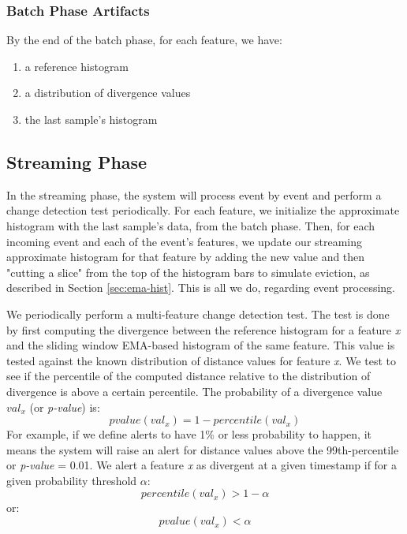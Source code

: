 \documentclass[sigconf]{acmart}
\begin{document}
\subsubsection{Batch Phase Artifacts} \label{sec:batch-artifacts-summary}
By the end of the batch phase, for each feature, we have: 
\begin{enumerate}
    \item a reference histogram
    \item a distribution of divergence values
    \item the last sample's histogram
\end{enumerate}


\subsection{Streaming Phase} \label{sec:stream-phase}
In the streaming phase, the system will process event by event and perform a change detection test periodically. For each feature, we initialize the approximate histogram with the last sample's data, from the batch phase. Then, for each incoming event and each of the event's features, we update our streaming approximate histogram for that feature by adding the new value and then "cutting a slice" from the top of the histogram bars to simulate eviction, as described in Section \ref{sec:ema-hist}. This is all we do, regarding event processing.

We periodically perform a multi-feature change detection test. The test is done by first computing the divergence between the reference histogram for a feature \textit{x} and the sliding window EMA-based histogram of the same feature. This value is tested against the known distribution of distance values for feature \textit{x}. We test to see if the percentile of the computed distance relative to the distribution of divergence is above a certain percentile. The probability of a divergence value $val_x$ (or \textit{p-value}) is:
\[pvalue(val_x) = 1 - percentile(val_x)\]
For example, if we define alerts to have 1\% or less probability to happen, it means the system will raise an alert for distance values above the 99th-percentile or \textit{p-value} = 0.01. We alert a feature \textit{x} as divergent at a given timestamp if for a given probability threshold $\alpha$:
\[ percentile(val_x) > 1 - \alpha \]
or:
\begin{equation}
    \label{eq:alert-test}
    pvalue(val_x) < \alpha
\end{equation}
\end{document}
